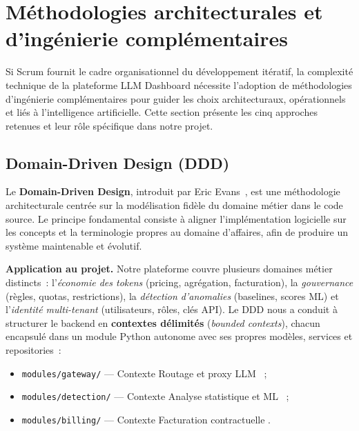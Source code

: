 \section{Méthodologies architecturales et d'ingénierie complémentaires}
\label{sec:methodologies_complementaires}

Si Scrum fournit le cadre organisationnel du développement itératif, la complexité technique de la plateforme LLM Dashboard nécessite l'adoption de méthodologies d'ingénierie complémentaires pour guider les choix architecturaux, opérationnels et liés à l'intelligence artificielle. Cette section présente les cinq approches retenues et leur rôle spécifique dans notre projet.

\subsection{Domain-Driven Design (DDD)}

Le \textbf{Domain-Driven Design}, introduit par Eric Evans~\cite{evans2003}, est une méthodologie architecturale centrée sur la modélisation fidèle du domaine métier dans le code source. Le principe fondamental consiste à aligner l'implémentation logicielle sur les concepts et la terminologie propres au domaine d'affaires, afin de produire un système maintenable et évolutif.

\textbf{Application au projet.} Notre plateforme couvre plusieurs domaines métier distincts~: l'\textit{économie des tokens} (pricing, agrégation, facturation), la \textit{gouvernance} (règles, quotas, restrictions), la \textit{détection d'anomalies} (baselines, scores ML) et l'\textit{identité multi-tenant} (utilisateurs, rôles, clés API). Le DDD nous a conduit à structurer le backend en \textbf{contextes délimités} (\textit{bounded contexts}), chacun encapsulé dans un module Python autonome avec ses propres modèles, services et repositories~:

\begin{itemize}[noitemsep]
    \item \texttt{modules/gateway/} --- Contexte \og Routage et proxy LLM \fg{}~;
    \item \texttt{modules/detection/} --- Contexte \og Analyse statistique et ML \fg{}~;
    \item \texttt{modules/billing/} --- Contexte \og Facturation contractuelle \fg{}.
\end{itemize}

